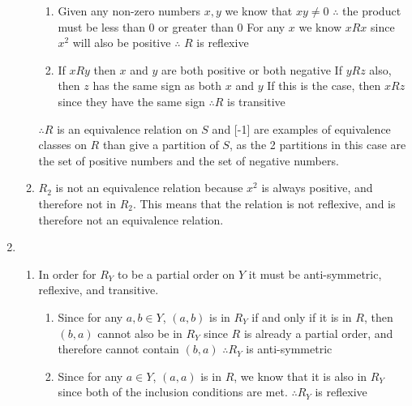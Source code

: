 \documentclass{article}
\begin{document}
\begin{enumerate}
\begin{enumerate}
\begin{enumerate}
				\item Given any non-zero numbers $x,y$ we know that $xy\neq0$
				\newline $\therefore$ the product must be less than 0 or greater than 0
				\newline For any $x$ we know $xRx$ since $x^2$ will also be positive
				\newline $\therefore$ $R$ is reflexive
				
				\item If $xRy$ then $x$ and $y$ are both positive or both negative
				\newline If $yRz$ also, then $z$ has the same sign as both $x$ and $y$
				\newline If this is the case, then $xRz$ since they have the same sign
				\newline $\therefore R$ is transitive
			\end{enumerate}
			$\therefore R$ is an equivalence relation on $S$
			\newline [1] and [-1] are examples of equivalence classes on $R$ than give a partition of $S$, as the 2 partitions in this case are the set of positive numbers and the set of negative numbers.
			
			\item $R_2$ is not an equivalence relation because $x^2$ is always positive, and therefore not in $R_2$. This means that the relation is not reflexive, and is therefore not an equivalence relation.
		\end{enumerate}
		
		\item
		\begin{enumerate}
			\item In order for $R_Y$ to be a partial order on $Y$ it must be anti-symmetric, reflexive, and transitive.
			\begin{enumerate}
				\item Since for any $a,b\in Y$, $(a,b)$ is in $R_Y$ if and only if it is in $R$, then $(b,a)$ cannot also be in $R_Y$ since $R$ is already a partial order, and therefore cannot contain $(b,a)$
				\newline $\therefore R_Y$ is anti-symmetric
				
				\item Since for any $a\in Y$, $(a,a)$ is in $R$, we know that it is also in $R_Y$ since both of the inclusion conditions are met.
				\newline $\therefore R_Y$ is reflexive
				

\end{enumerate}
\end{enumerate}
\end{enumerate}
\end{document}
